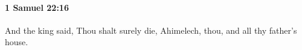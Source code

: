 
		\paragraph{1 Samuel 22:16} %
			\label{1SAMUEL-22-16}

			And the king said, Thou shalt surely die, Ahimelech, thou, and all thy father’s house.


